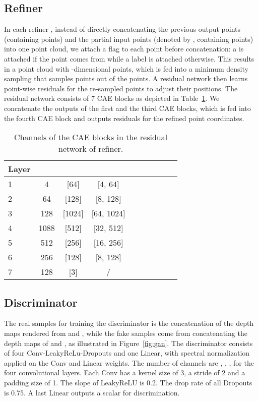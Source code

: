 \documentclass[final]{cvpr}
\begin{document}
\subsection{Refiner}
In each refiner , instead of directly concatenating the previous output points (containing  points) and the partial input points (denoted by , containing  points) into one point cloud, we attach a flag to each point before concatenation: a  is attached if the point comes from  while a  label is attached otherwise. This results in a point cloud with  -dimensional points,
which is fed into a minimum density sampling \cite{liu2019morphing} that samples  points out of the  points. 
A residual network then learns point-wise residuals for the re-sampled  points to adjust their positions. The residual network consists of 7 CAE blocks as depicted in Table~\ref{table:network_residual_network}.
We concatenate the outputs of the first and the third CAE blocks, which is fed into the fourth CAE block and outputs residuals for the refined point coordinates.


\begin{table}[h]
\begin{center}
\footnotesize
\setlength\tabcolsep{1.5pt}
\begin{tabular}{@{}l|cccccccc|c@{}}
\toprule
Layer &  &  &   \\
\midrule
1& 4 & [64] &[4, 64] \\
2& 64 & [128] &[8, 128]\\
3& 128 & [1024]&[64, 1024]\\
4& 1088 & [512] &[32, 512] \\
5& 512 & [256] &[16, 256] \\
6& 256 & [128] &[8, 128] \\
7& 128 & [3] & / \\
\bottomrule
\end{tabular}
\end{center}
\caption{Channels of the CAE blocks in the residual network of refiner.}
\label{table:network_residual_network}
\end{table}

\subsection{Discriminator}
The real samples for training the discriminator  is the concatenation of the depth maps rendered from  and ,
while the fake samples come from concatenating the depth maps of  and , as illustrated in Figure~\ref{fig:gan}. 
The discriminator consists of four Conv-LeakyReLu-Dropouts and one Linear, with spectral normalization \cite{miyato2018spectral} applied on the Conv and Linear weights. The number of channels are , , ,  for the four convolutional layers. Each Conv has a kernel size of 3, a stride of 2 and a padding size of 1. The slope of LeakyReLU is 0.2. The drop rate of all Dropouts is 0.75.
A last Linear outputs a scalar for discrimination. 
\end{document}
